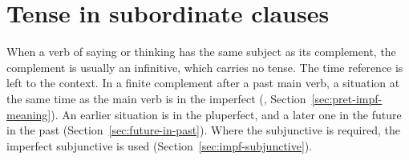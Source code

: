 \section{Tense in subordinate clauses}\label{sec:tense-subordinate}
When a verb of saying or thinking has the same subject as its complement, the complement is usually an infinitive, which carries no tense. The time reference is left to the context.
In a finite complement after a past main verb, a situation at the same time as the main verb is in the imperfect (, Section~\ref{sec:pret-impf-meaning}). An earlier situation is in the pluperfect, and a later one in the future in the past (Section~\ref{sec:future-in-past}). Where the subjunctive is required, the imperfect subjunctive is used (Section~\ref{sec:impf-subjunctive}).

